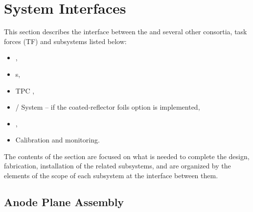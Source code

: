 \section{System Interfaces}
\label{sec:fdsp-pd-intfc}



This section describes the interface between the 
  and several other consortia, task forces (TF) and subsystems listed below:

\begin{itemize}
\item {},
\item{\fdth{}s},
\item TPC , 
\item{ /  System -- if the coated-reflector foils option is implemented},
\item {},
\item Calibration and monitoring.
\end{itemize}
%
The contents of the section are focused on what is needed to complete the design, fabrication, installation of the related subsystems, and are organized by the elements of the scope of each subsystem at the interface between them.


\subsection{Anode Plane Assembly}
\label{sec:fdsp-pd-intfc-apa}



